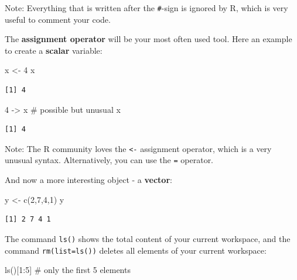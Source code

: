 \documentclass[
  letterpaper,
  DIV=11,
  numbers=noendperiod]{scrreprt}
\newenvironment{Shaded}{\begin{snugshade}}{\end{snugshade}}
\newcommand{\CommentTok}[1]{\textcolor[rgb]{0.37,0.37,0.37}{#1}}
\newcommand{\DecValTok}[1]{\textcolor[rgb]{0.68,0.00,0.00}{#1}}
\newcommand{\FunctionTok}[1]{\textcolor[rgb]{0.28,0.35,0.67}{#1}}
\newcommand{\NormalTok}[1]{\textcolor[rgb]{0.00,0.23,0.31}{#1}}
\newcommand{\OtherTok}[1]{\textcolor[rgb]{0.00,0.23,0.31}{#1}}
\newcommand{\SpecialCharTok}[1]{\textcolor[rgb]{0.37,0.37,0.37}{#1}}
\theoremstyle{definition}
\theoremstyle{plain}
\theoremstyle{plain}
\theoremstyle{remark}
\begin{document}
Note: Everything that is written after the \texttt{\#}-sign is ignored
by R, which is very useful to comment your code.

The \textbf{assignment operator} will be your most often used tool. Here
an example to create a \textbf{scalar} variable:

\begin{Shaded}
\begin{Highlighting}[]
\NormalTok{x }\OtherTok{\textless{}{-}} \DecValTok{4} 
\NormalTok{x}
\end{Highlighting}
\end{Shaded}

\begin{verbatim}
[1] 4
\end{verbatim}

\begin{Shaded}
\begin{Highlighting}[]
\DecValTok{4} \OtherTok{{-}\textgreater{}}\NormalTok{ x }\CommentTok{\# possible but unusual}
\NormalTok{x}
\end{Highlighting}
\end{Shaded}

\begin{verbatim}
[1] 4
\end{verbatim}

Note: The R community loves the \texttt{\textless{}-} assignment
operator, which is a very unusual syntax. Alternatively, you can use the
\texttt{=} operator.

And now a more interesting object - a \textbf{vector}:

\begin{Shaded}
\begin{Highlighting}[]
\NormalTok{y }\OtherTok{\textless{}{-}} \FunctionTok{c}\NormalTok{(}\DecValTok{2}\NormalTok{,}\DecValTok{7}\NormalTok{,}\DecValTok{4}\NormalTok{,}\DecValTok{1}\NormalTok{)}
\NormalTok{y}
\end{Highlighting}
\end{Shaded}

\begin{verbatim}
[1] 2 7 4 1
\end{verbatim}

The command \texttt{ls()} shows the total content of your current
workspace, and the command \texttt{rm(list=ls())} deletes all elements
of your current workspace:

\begin{Shaded}
\begin{Highlighting}[]
\FunctionTok{ls}\NormalTok{()[}\DecValTok{1}\SpecialCharTok{:}\DecValTok{5}\NormalTok{] }\CommentTok{\# only the first 5 elements}
\end{Highlighting}
\end{Shaded}
\end{document}

